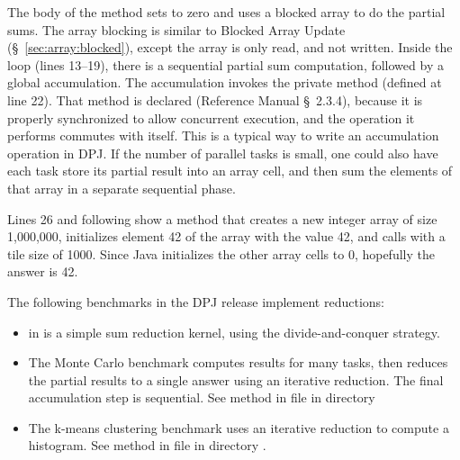 The body of the  method sets  to zero and uses a
blocked array to do the partial sums.  The array blocking is similar
to Blocked Array Update (\S~\ref{sec:array:blocked}), except the array
is only read, and not written.  Inside the  loop (lines
13--19), there is a sequential partial sum computation, followed by a
global accumulation.  The accumulation invokes the private method
 (defined at line 22).  That method is declared
 (Reference Manual \S~2.3.4), because it is properly
synchronized to allow concurrent execution, and the operation it
performs commutes with itself.  This is a typical way to write an
accumulation operation in DPJ.  If the number of parallel tasks is
small, one could also have each task store its partial result into an
array cell, and then sum the elements of that array in a separate
sequential phase.

Lines 26 and following show a  method that creates a new
integer array of size 1,000,000, initializes element 42 of the array
with the value 42, and calls  with a tile size of 1000.
Since Java initializes the other array cells to 0, hopefully the
answer is 42.

 The following benchmarks in the DPJ release
implement reductions:
%
\begin{itemize}
%
\item {} in  is a simple
  sum reduction kernel, using the divide-and-conquer strategy.
%
\item The Monte Carlo benchmark computes results for many tasks, then
  reduces the partial results to a single answer using an iterative
  reduction.  The final accumulation step is sequential.  See method
   in file  in directory
%
\item The k-means clustering benchmark uses an iterative reduction to
  compute a histogram.  See method  in file
   in directory
  .
%
\end{itemize}
